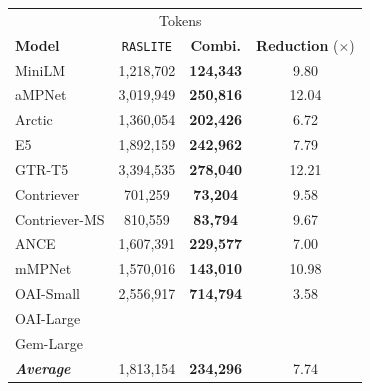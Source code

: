 \documentclass[a4paper, sigconf]{acmart}
\begin{document}
\begin{tabular}{l|cc|c}
\hline
& \multicolumn{2}{c|}{Tokens} & \\
\textbf{Model} & \texttt{RASLITE} & \textbf{Combi.} & \textbf{Reduction} ($\times$) \\ \hline
MiniLM & 1,218,702 & \textbf{124,343} & 9.80\\ \hline
aMPNet & 3,019,949 & \textbf{250,816} & 12.04\\ \hline
Arctic & 1,360,054 & \textbf{202,426} & 6.72\\ \hline
E5 & 1,892,159 & \textbf{242,962} & 7.79\\ \hline
GTR-T5 & 3,394,535 & \textbf{278,040} & 12.21\\ \hline
Contriever & 701,259 & \textbf{73,204} & 9.58\\ \hline
Contriever-MS & 810,559 & \textbf{83,794} & 9.67\\ \hline
ANCE & 1,607,391 & \textbf{229,577} & 7.00\\ \hline
mMPNet & 1,570,016 & \textbf{143,010} & 10.98\\ \hline
OAI-Small\footnotemark[1] & 2,556,917 & \textbf{714,794} & 3.58\\ \hline
OAI-Large\footnotemark[1] & & \\ \hline
Gem-Large\footnotemark[1] & & \\ \hline
\hline 
\textbf{\textit{Average}} & 1,813,154 & \textbf{234,296} & 7.74\\ \hline
\end{tabular}
\end{document}
